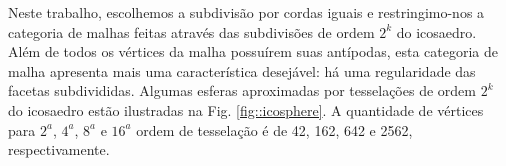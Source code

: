 \documentclass[
    12pt,                %
    oneside,            %
    a4paper,            %
    english,            %
    french,                %
    spanish,            %
    brazil                %
    ]{abntex2}
\begin{document}


Neste trabalho, escolhemos a subdivisão por cordas iguais e restringimo-nos a categoria de malhas feitas através das subdivisões de ordem $2^k$ do icosaedro. Além de todos os vértices da malha possuírem suas antípodas, esta categoria de malha apresenta mais uma característica desejável: há uma regularidade das facetas subdivididas. Algumas esferas aproximadas por tesselações de ordem $2^k$ do icosaedro estão ilustradas na Fig. \ref{fig::icosphere}. A quantidade de vértices para $2^a$, $4^a$, $8^a$ e $16^a$ ordem de tesselação é de 42, 162, 642 e 2562, respectivamente.
\end{document}
